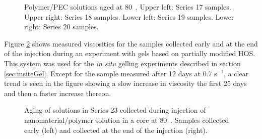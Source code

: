 \documentclass[energies,article,submit,moreauthors,pdftex]{Definitions/mdpi}
\begin{document}
\begin{figure}[h!]
    \centering
    \caption{Polymer/PEC solutions aged at 80~\celsius. Upper left: Series 17 samples. Upper right: Series 18 samples. Lower left: Series 19 samples. Lower right: Series 20 samples.}
    \label{cht:s17visc80}
\end{figure}

Figure \ref{cht:s23visc80} shows measured viscosities for the samples collected early and at the end of the injection during an experiment with gels based on partially modified HOS.
This system was used for the \textit{in situ} gelling experiments described in section \ref{sec:insiteGel}. Except for the sample measured after 12 days at 0.7 s$^{-1}$, a clear trend is seen in the figure showing a slow increase in viscosity the first 25 days and then a faster increase thereon.

\begin{figure}[h!] 
    \centering
    \caption{Aging of solutions in Series 23 collected during injection of nanomaterial/polymer solution in a core at 80~\celsius. Samples collected early (left) and collected at the end of the injection (right).}
    \label{cht:s23visc80}
\end{figure} 
\end{document}
